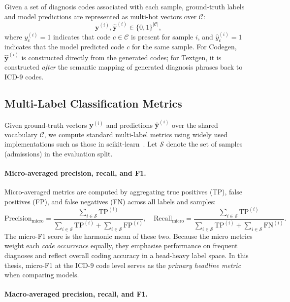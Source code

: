 Given a set of diagnosis codes associated with each sample, ground-truth labels and model predictions are represented as multi-hot vectors over $\mathcal{C}$:
\[
    \mathbf{y}^{(i)}, \hat{\mathbf{y}}^{(i)} \in \{0,1\}^{|\mathcal{C}|},
\]
where $y^{(i)}_c = 1$ indicates that code $c \in \mathcal{C}$ is present for sample $i$, and $\hat{y}^{(i)}_c = 1$ indicates that the model predicted code $c$ for the same sample. For Codegen, $\hat{\mathbf{y}}^{(i)}$ is constructed directly from the generated codes; for Textgen, it is constructed \emph{after} the semantic mapping of generated diagnosis phrases back to ICD-9 codes.

\subsection{Multi-Label Classification Metrics}
\label{subsec:ml-metrics}

Given ground-truth vectors $\mathbf{y}^{(i)}$ and predictions $\hat{\mathbf{y}}^{(i)}$ over the shared vocabulary $\mathcal{C}$, we compute standard multi-label metrics using widely used implementations such as those in scikit-learn~\cite{pedregosa2011scikit}. Let $\mathcal{S}$ denote the set of samples (admissions) in the evaluation split.

\paragraph{Micro-averaged precision, recall, and F1.}

Micro-averaged metrics are computed by aggregating true positives (TP), false positives (FP), and false negatives (FN) across all labels and samples:
\[
    \text{Precision}_{\text{micro}} =
    \frac{\sum_{i \in \mathcal{S}} \text{TP}^{(i)}}{\sum_{i \in \mathcal{S}} \text{TP}^{(i)} + \sum_{i \in \mathcal{S}} \text{FP}^{(i)}}, \quad
    \text{Recall}_{\text{micro}} =
    \frac{\sum_{i \in \mathcal{S}} \text{TP}^{(i)}}{\sum_{i \in \mathcal{S}} \text{TP}^{(i)} + \sum_{i \in \mathcal{S}} \text{FN}^{(i)}}.
\]
The micro-F1 score is the harmonic mean of these two. Because the micro metrics weight each \emph{code occurrence} equally, they emphasise performance on frequent diagnoses and reflect overall coding accuracy in a head-heavy label space. In this thesis, micro-F1 at the ICD-9 code level serves as the \emph{primary headline metric} when comparing models.

\paragraph{Macro-averaged precision, recall, and F1.}

